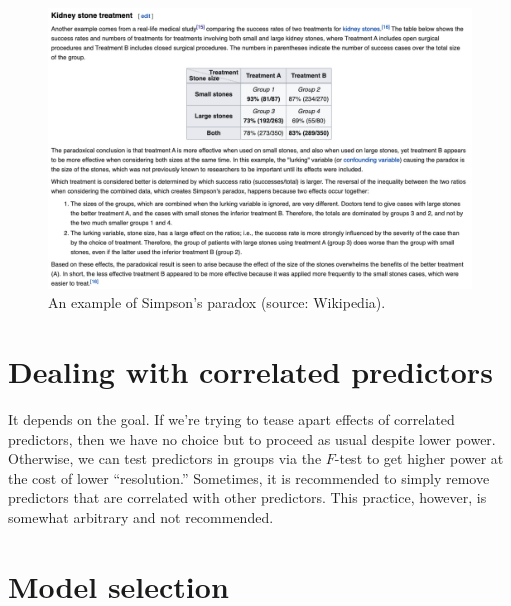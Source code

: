 \documentclass[
  11pt,
  letterpaper,
  oneside]{book}
\theoremstyle{definition}
\theoremstyle{plain}
\theoremstyle{plain}
\theoremstyle{plain}
\theoremstyle{remark}
\begin{document}
\begin{figure}

{\centering \includegraphics[width=1\textwidth,height=\textheight]{figures/kidney-stones.png}

}

\caption{\label{fig-simpson-paradox}An example of Simpson's paradox
(source: Wikipedia).}

\end{figure}

\hypertarget{dealing-with-correlated-predictors}{%
\section{Dealing with correlated
predictors}\label{dealing-with-correlated-predictors}}

It depends on the goal. If we're trying to tease apart effects of
correlated predictors, then we have no choice but to proceed as usual
despite lower power. Otherwise, we can test predictors in groups via the
\(F\)-test to get higher power at the cost of lower ``resolution.''
Sometimes, it is recommended to simply remove predictors that are
correlated with other predictors. This practice, however, is somewhat
arbitrary and not recommended.

\hypertarget{model-selection}{%
\section{Model selection}\label{model-selection}}
\end{document}
